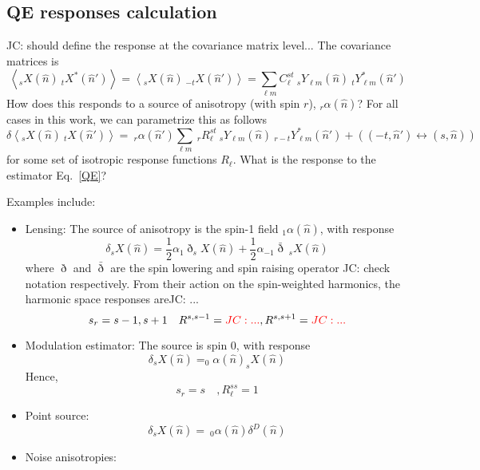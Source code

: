 \documentclass{article}
\newcommand{\Ylm}[1]{\:_{#1}Y_{\ell m}}
\newcommand{\Ylms}[1]{\:_{#1}Y^*_{\ell m}}
\newcommand{\av}[1]{\left\langle #1 \right\rangle}
\newcommand{\JC}[1]{\color{red}JC: #1\color{black}}
\newcommand{\hn}[0]{\hat n}
\begin{document}
\newpage \subsection{QE responses calculation}
 \JC{should define the response at the covariance matrix level...}
 The covariance matrices is
 \begin{equation}
 	\av{_sX(\hn)\:_tX^*(\hn')} =\av{_sX(\hn)\:_{-t}X(\hn')} = \sum_{\ell m} C^{s t}_\ell \Ylm s(\hn) \Ylms {t}(\hn')
 \end{equation}
 How does this responds to a source of anisotropy (with spin $r$), $_r\alpha(\hn)$? For all cases in this work, we can parametrize this as follows
  \begin{equation}
 	\delta \av{_sX(\hn)\:_{t}X(\hn')} = \:_r\alpha(\hn')\sum_{\ell m}\: _rR^{st}_\ell \Ylm s(\hn) \Ylms {r - t}(\hn') + ( (-t, \hn') \leftrightarrow (s,\hn))
 \end{equation}
for some set of isotropic response functions $R_\ell$. What is the response to the estimator Eq.~\eqref{QE}?

Examples include:
\begin{itemize}
	\item Lensing: The source of anisotropy is the spin-1 field $_1\alpha(\hn)$, with response
	\begin{equation}
		\delta _sX(\hn) =  \frac 12 \alpha_1 \eth _{s}X(\hn) + \frac 12 \alpha_{-1} \bar \eth \:_sX(\hn) 
	\end{equation}
	where $\eth$ and $\bar \eth$ are the spin lowering and spin raising operator \JC{check notation } respectively. From their action on the spin-weighted harmonics, the harmonic space responses are\JC{...}
	\begin{equation}
		s_r = s-1, s+ 1 \quad R^{s,s-1} = \JC{...}, R^{s,s+1} = \JC{...}
	\end{equation}
	\item Modulation estimator: The source is spin 0, with response
	\begin{equation}
	\delta _sX(\hn) = _0\alpha(\hn) _{s}X(\hn)	
	\end{equation}
	Hence,
	\begin{equation}
		s_r = s\quad, R_\ell^{ss} = 1
	\end{equation}
	\item Point source:
	\begin{equation}
	\delta _sX(\hn) = \:_0\alpha(\hn) \delta^D(\hn)
	\end{equation}
	\item Noise anisotropies:
\end{itemize} 
\end{document}
